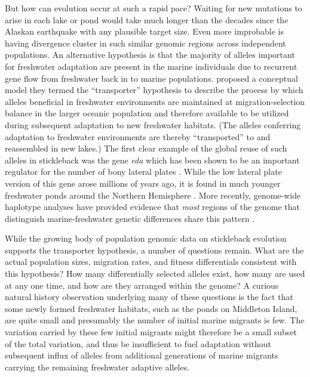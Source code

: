 \documentclass{article}
\begin{document}
But how can evolution occur at such a rapid pace?
Waiting for new mutations to arise in each lake or pond would take much longer than the decades since the Alaskan earthquake
with any plausible target size.
Even more improbable is having divergence cluster in such similar genomic regions across independent populations. 
An alternative hypothesis
is that the majority of alleles important for freshwater adaptation are present in the marine individuals due to recurrent gene flow from freshwater back in to marine populations. 
\citet{schluter2009genetics} proposed a conceptual model they termed the ``transporter'' hypothesis to describe the process by which 
alleles beneficial in freshwater environments are maintained at migration-selection balance in the larger oceanic population and therefore available to be utilized during subsequent adaptation to new freshwater habitats.
(The alleles conferring adaptation to freshwater environments are thereby ``transported'' to and reassembled in new lakes.)
The first clear example of the global reuse of such alleles in stickleback was the gene \textit{eda} which has been shown to be an important regulator for the number of bony lateral plates 
\citep{Colosimo_2004, Cresko_2004, Colosimo_2005}. 
While the low lateral plate version of this gene arose millions of years ago, it is found in much younger freshwater ponds around the Northern Hemisphere 
\citep{O'Brian_2015}. 
More recently, genome-wide haplotype analyses have provided evidence that \textit{most} regions of the genome that distinguish marine-freshwater genetic differences share this pattern \citep{nelson2017ancient}. 

While the growing body of population genomic data on stickleback evolution supports the transporter hypothesis, a number of questions remain. 
What are the actual population sizes, migration rates, and fitness differentials consistent with this hypothesis? 
How many differentially selected alleles exist, how many are used at any one time, and how are they arranged within the genome? 
A curious natural history observation underlying many of these questions is the fact that some newly formed freshwater habitats, such as the ponds on Middleton Island, 
are quite small and presumably the number of initial marine migrants is few. The variation carried by these few initial migrants might therefore be a small subset of the total variation, and thus be insufficient to fuel adaptation without subsequent influx of alleles from additional generations of marine migrants carrying the remaining freshwater adaptive alleles.
\end{document}
